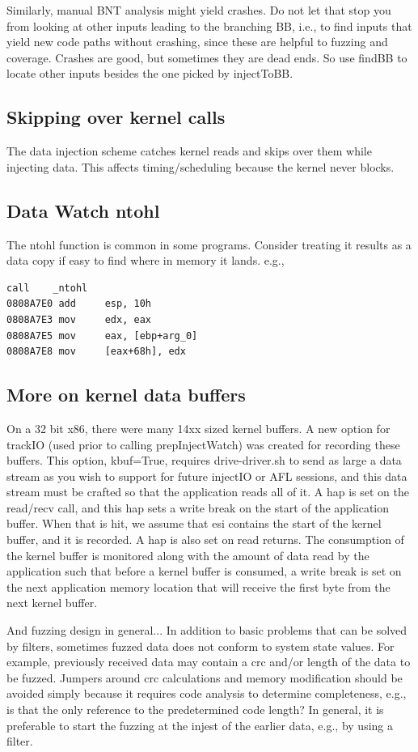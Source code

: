\documentclass[titlepage]{article}
\begin{document}
\begin{appendices}
Similarly, manual BNT analysis might yield crashes.  Do not let that stop you from looking at other inputs leading to the branching BB, i.e., to find inputs that
yield new code paths without crashing, since these are helpful to fuzzing and coverage.  Crashes are good, but sometimes they are dead ends.  So use findBB to locate other
inputs besides the one picked by injectToBB.


\subsection{Skipping over kernel calls}
The data injection scheme catches kernel reads and skips over them while injecting data.  This affects timing/scheduling because the kernel never
blocks.

\subsection{Data Watch ntohl}
The ntohl function is common in some programs.  Consider treating it results as a data copy if easy to find where in memory it lands. e.g.,
\begin{verbatim}
call    _ntohl
0808A7E0 add     esp, 10h
0808A7E3 mov     edx, eax
0808A7E5 mov     eax, [ebp+arg_0]
0808A7E8 mov     [eax+68h], edx
\end{verbatim}

\subsection{More on kernel data buffers}
On a 32 bit x86, there were many 14xx sized kernel buffers.  A new option for trackIO (used prior to calling prepInjectWatch) was created for recording these buffers.
This option, kbuf=True, requires drive-driver.sh to send as large a data stream as you wish to support for future injectIO or AFL sessions, and this data stream
must be crafted so that the application reads all of it.  A hap is set on the read/recv call, and this hap sets a write break on the start of the application buffer.  When that is hit, we assume that esi contains the start of the kernel buffer, and it is recorded.  A hap is also set on read returns.  The consumption of the
kernel buffer is monitored along with the amount of data read by the application such that before a kernel buffer is consumed, a write break is set on the next 
application memory location that will receive the first byte from the next kernel buffer.

And fuzzing design in general... In addition to basic problems that can be solved by filters, sometimes fuzzed data does not conform to system state values.
For example, previously received data may contain a crc and/or length of the data to be fuzzed.  Jumpers around crc calculations and memory modification should
be avoided simply because it requires code analysis to determine completeness, e.g., is that the only reference to the predetermined code length?  In general,
it is preferable to start the fuzzing at the injest of the earlier data, e.g., by using a filter.

\end{appendices}
\end{document}
